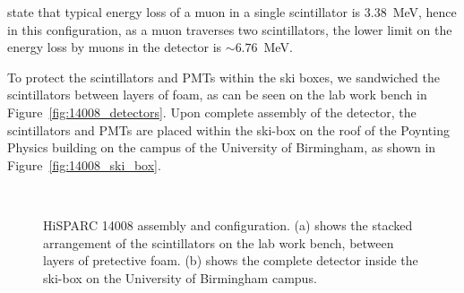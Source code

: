 \cite{bartels_hisparc_2012} state that typical energy loss of a muon in a single scintillator is $3.38$~MeV, hence in this configuration, as a muon traverses two scintillators, the lower limit on the energy loss by muons in the detector is $\sim 6.76$~MeV.

To protect the scintillators and PMTs within the ski boxes, we sandwiched the scintillators between layers of foam, as can be seen on the lab work bench in Figure~\ref{fig:14008_detectors}. Upon complete assembly of the detector, the scintillators and PMTs are placed within the ski-box on the roof of the Poynting Physics building on the campus of the University of Birmingham, as shown in Figure~\ref{fig:14008_ski_box}.

\begin{figure}[ht]
	\centering
	 \\
	
	\caption{HiSPARC 14008 assembly and configuration. (a) shows the stacked arrangement of the scintillators on the lab work bench, between layers of pretective foam. (b) shows the complete detector inside the ski-box on the University of Birmingham campus.}
	\label{fig:HS_14008_setup}
\end{figure}


